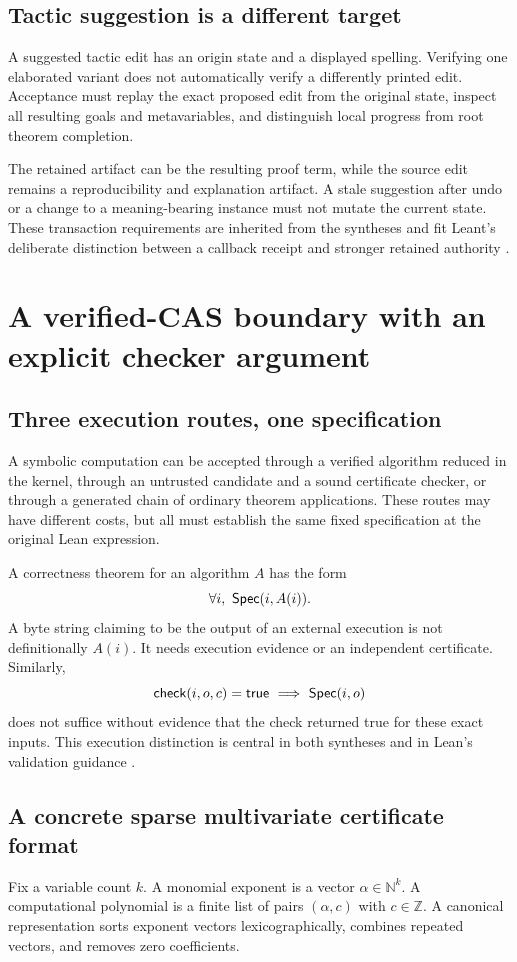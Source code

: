 \documentclass[11pt,letterpaper]{article}
\theoremstyle{definition}\newtheorem{definition}[theorem]{Definition}
\newcommand{\N}{\mathbb N}\newcommand{\Z}{\mathbb Z}\newcommand{\Q}{\mathbb Q}\newcommand{\R}{\mathbb R}\newcommand{\C}{\mathbb C}
\begin{document}
\subsection{Tactic suggestion is a different target}
A suggested tactic edit has an origin state and a displayed spelling. Verifying one elaborated variant does not automatically verify a differently printed edit. Acceptance must replay the exact proposed edit from the original state, inspect all resulting goals and metavariables, and distinguish local progress from root theorem completion.

The retained artifact can be the resulting proof term, while the source edit remains a reproducibility and explanation artifact. A stale suggestion after undo or a change to a meaning-bearing instance must not mutate the current state. These transaction requirements are inherited from the syntheses and fit Leant's deliberate distinction between a callback receipt and stronger retained authority \cite{reportA,reportB,leantVerification}.

\section{A verified-CAS boundary with an explicit checker argument}\label{sec:cas}
\subsection{Three execution routes, one specification}
A symbolic computation can be accepted through a verified algorithm reduced in the kernel, through an untrusted candidate and a sound certificate checker, or through a generated chain of ordinary theorem applications. These routes may have different costs, but all must establish the same fixed specification at the original Lean expression.

A correctness theorem for an algorithm $A$ has the form
\[
 \forall i,\ \Spec(i,A(i)).
\]
A byte string claiming to be the output of an external execution is not definitionally $A(i)$. It needs execution evidence or an independent certificate. Similarly,
\[
 \mathsf{check}(i,o,c)=\mathsf{true}\ \Longrightarrow\ \Spec(i,o)
\]
does not suffice without evidence that the check returned true for these exact inputs. This execution distinction is central in both syntheses and in Lean's validation guidance \cite{reportA,reportB,leanValidation}.

\subsection{A concrete sparse multivariate certificate format}
Fix a variable count $k$. A monomial exponent is a vector $\alpha\in\N^k$. A computational polynomial is a finite list of pairs $(\alpha,c)$ with $c\in\Z$. A canonical representation sorts exponent vectors lexicographically, combines repeated vectors, and removes zero coefficients.
\end{document}

